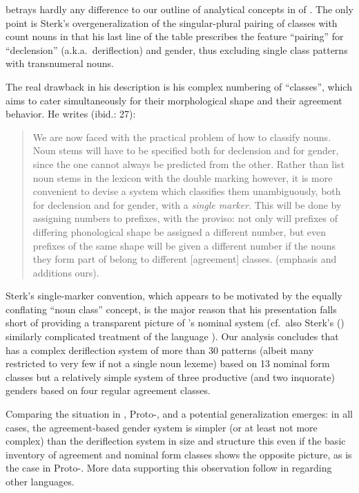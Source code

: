 \documentclass[output=collectionpaper]{langsci/langscibook}
\begin{document}
 betrays hardly any difference to our outline of analytical concepts in  of . The only point is Sterk's overgeneralization of the singular-plural pairing of classes with count nouns in that his last line of the table prescribes the feature ``pairing'' for ``declension'' (a.k.a.\ deriflection) and gender, thus excluding single class patterns with transnumeral nouns.

The real drawback in his description is his complex numbering of ``classes'', which aims to cater simultaneously for their morphological shape and their agreement behavior. He writes (ibid.: 27):

\begin{samepage}
\begin{quote}
We are now faced with the practical problem of how to classify  nouns. Noun stems will have to be specified both for declension and for gender, since the one cannot always be predicted from the other. Rather than list noun stems in the lexicon with the double marking however, it is more convenient to devise a system which classifies them unambiguously, both for declension and for gender, with a \emph{single marker}. This will be done by assigning numbers to prefixes, with the proviso: not only will prefixes of differing phonological shape be assigned a different number, but even prefixes of the same shape will be given a different number if the nouns they form part of belong to different [agreement] classes. (emphasis and additions ours).
\end{quote}
\end{samepage}

Sterk's single-marker convention, which appears to be motivated by the equally conflating ``noun class'' concept, is the major reason that his presentation falls short of providing a transparent picture of 's nominal system (cf.\ also Sterk's (\citeyear{Sterk1976}) similarly complicated treatment of the  language ). Our analysis concludes that  has a complex deriflection system of more than 30 patterns (albeit many restricted to very few if not a single noun lexeme) based on 13 nominal form classes but a relatively simple system of three productive (and two inquorate) genders based on four regular agreement classes.

Comparing the situation in , Proto-, and  a potential generalization emerges: in all cases, the agreement-based gender system is simpler (or at least not more complex) than the deriflection system in size and structure \textendash{} this even if the basic inventory of agreement and nominal form classes shows the opposite picture, as is the case in Proto-. More data supporting this observation follow in  regarding other  languages.
\end{document}
